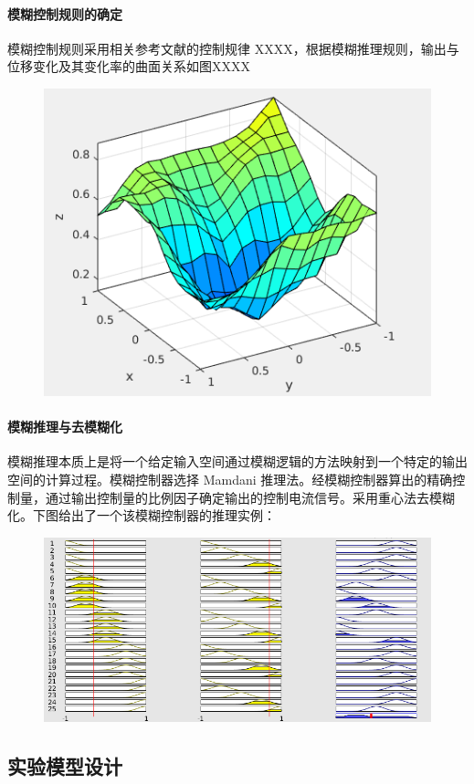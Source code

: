 \paragraph{模糊控制规则的确定}
\qquad 模糊控制规则采用相关参考文献的控制规律 XXXX，根据模糊推理规则，输出与位移变化及其变化率的曲面关系如图XXXX
\begin{figure}[H]
\centering
\includegraphics[width=0.5\linewidth]{figure/fuzzysurface}
\end{figure}

\paragraph{模糊推理与去模糊化}
\qquad 模糊推理本质上是将一个给定输入空间通过模糊逻辑的方法映射到一个特定的输出空间的计算过程。模糊控制器选择 Mamdani 推理法。经模糊控制器算出的精确控制量，通过输出控制量的比例因子确定输出的控制电流信号。采用重心法去模糊化。下图给出了一个该模糊控制器的推理实例：

\begin{figure}[H]
\centering
\includegraphics[width=0.5\linewidth]{figure/fuzzyeg}
\end{figure}


%

\subsection{实验模型设计}

